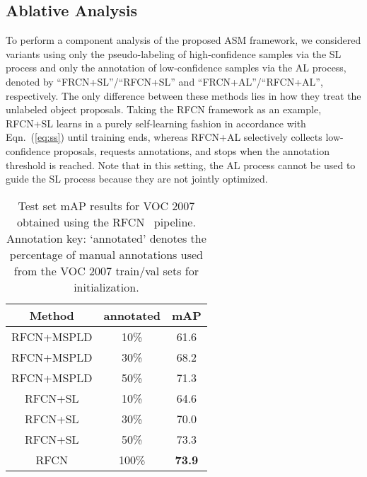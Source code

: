 \documentclass[journal]{IEEEtran}
\begin{document}
{\subsection{Ablative Analysis}
To perform {a} component analysis of the proposed {ASM} {framework, we considered} variants using only the pseudo-labeling of high-confidence samples via the SL process and only the annotation of low-confidence samples via the AL process, denoted by ``FRCN+SL''/``RFCN+SL'' and ``FRCN+AL''/``RFCN+AL'', respectively. The only difference {between these methods} lies in how they treat the unlabeled object proposals. Taking the RFCN framework as an example, RFCN+SL learns in a purely self-learning fashion in accordance with Eqn.~(\ref{eq:ss}) until training ends, whereas RFCN+AL selectively collects low-confidence proposals, requests annotations, and stops when the annotation threshold is reached. Note that in this setting, the AL process cannot be used to guide the SL process because they are not jointly optimized.





\begin{table}[t]
\footnotesize
\center
\setlength{\tabcolsep}{2.5pt}\vspace{-5pt}
\caption{{Test set mAP results for VOC 2007 {obtained} using the RFCN~\cite{rfcn16NIPS} pipeline. Annotation key: `annotated' denotes the percentage of manual annotations used from the VOC 2007 train/val sets for initialization.}}\label{tab:07mAP07_fewshot}
\vspace{-5pt}
{\begin{tabular}{c | c | c }
\hline
\hline
Method &  annotated  & mAP \\
\hline
RFCN+MSPLD & 10\%  & 61.6 \\
RFCN+MSPLD & 30\%  & 68.2 \\
RFCN+MSPLD & 50\%   & 71.3 \\
RFCN+SL & 10\%   & 64.6	\\
RFCN+SL & 30\%   & 70.0	\\
RFCN+SL & 50\%   & 73.3 \\
\hline
RFCN & 100\% & \bf 73.9 \\
\hline
\hline
\end{tabular}}
\vspace{-10pt}
\end{table}


}
\end{document}
